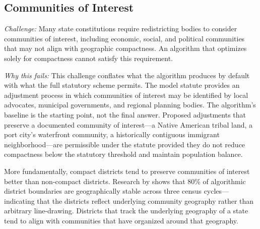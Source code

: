 \subsection{Communities of Interest}

\textit{Challenge:} Many state constitutions require redistricting bodies to consider communities of interest, including economic, social, and political communities that may not align with geographic compactness. An algorithm that optimizes solely for compactness cannot satisfy this requirement.

\textit{Why this fails:} This challenge conflates what the algorithm produces by default with what the full statutory scheme permits. The model statute provides an adjustment process in which communities of interest may be identified by local advocates, municipal governments, and regional planning bodies. The algorithm's baseline is the starting point, not the final answer. Proposed adjustments that preserve a documented community of interest---a Native American tribal land, a port city's waterfront community, a historically contiguous immigrant neighborhood---are permissible under the statute provided they do not reduce compactness below the statutory threshold and maintain population balance.

More fundamentally, compact districts tend to preserve communities of interest better than non-compact districts. Research by \citet{dellaLibera2026stability} shows that 80\% of algorithmic district boundaries are geographically stable across three census cycles---indicating that the districts reflect underlying community geography rather than arbitrary line-drawing. Districts that track the underlying geography of a state tend to align with communities that have organized around that geography.
